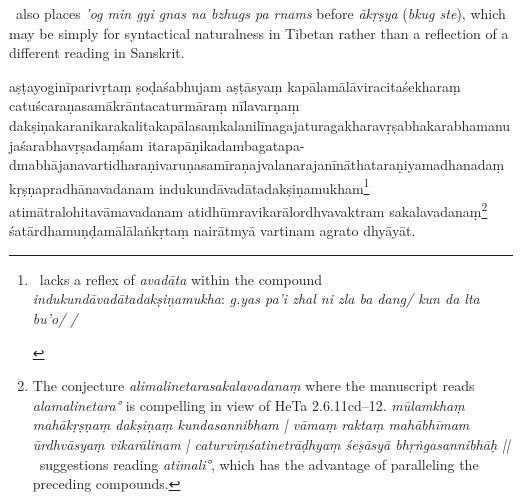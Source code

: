 \documentclass[naipra.tex]{subfiles}
\begin{document}
\begin{sanskrit}
{\begin{english}
		\TIB\ also places \emph{'og min gyi gnas na bzhugs pa rnams} before \emph{ākṛṣya} (\emph{bkug ste}), which may be simply for syntactical naturalness in Tibetan rather than a reflection of a different reading in Sanskrit.
	\end{english}
} aṣṭayoginīparivṛtaṃ ṣoḍaśabhujam aṣṭāsyaṃ kapālamālāviracitaśekharaṃ catuścaraṇasamākrāntacaturmāraṃ nīlavarṇaṃ dakṣiṇakaranikarakalitakapālasaṃkalanilīnagaja\dsh turaga\dsh khara\dsh vṛṣabha\dsh karabha\dsh manuja\dsh śarabha\dsh vṛṣadaṃśam itarapāṇikadambagatapa-\\ dmabhājanavartidharaṇi\dsh varuṇa\dsh samīraṇa\dsh jvalana\dsh rajanīnātha\dsh taraṇi\dsh yama\dsh dhanadaṃ kṛṣṇapradhānavadanam indukundāvadātadakṣiṇamukham\footnote{
	\begin{english}%
		\TIB\ lacks a reflex of \emph{avadāta} within the compound \emph{indukundāvadātadakṣiṇamukha}: \emph{g.yas pa'i zhal ni zla ba dang/ kun da lta bu'o/ /}
	\end{english}
} atimātralohitavāmavadanam atidhūmravikarālordhvavaktram sakalavadanaṃ\footnote{
	The conjecture \emph{alimalinetarasakalavadanaṃ} where the manuscript reads \emph{alamalinetara°} is compelling in view of HeTa 2.6.11cd–12.
	\emph{mūlamkhaṃ mahākṛṣṇaṃ dakṣiṇaṃ kundasannibham | vāmaṃ raktaṃ mahābhīmam ūrdhvāsyaṃ vikarālinam | caturviṃśatinetrāḍhyaṃ śeṣāsyā bhṛṅgasannibhāḥ ||}
	\TIB\ suggestions reading \emph{atimali°}, which has the advantage of paralleling the preceding compounds.
} śatārdhamuṇḍamālālaṅkṛtaṃ nairātmyā vartinam agrato dhyāyāt. 
\pend




\end{sanskrit}
\end{document}
